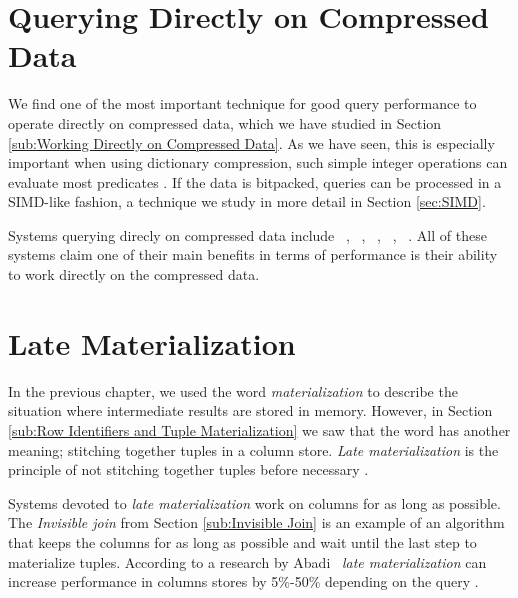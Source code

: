 \section{Querying Directly on Compressed Data}
\label{sec:Querying Directly on Compressed Data}
We find one of the most important technique for good query performance to operate directly on compressed data, which we have studied in Section \ref{sub:Working Directly on Compressed Data}. As we have seen, this is especially important when using dictionary compression, such simple integer operations can evaluate most predicates \cite{Abadi2008-dd}. If the data is bitpacked, queries can be processed in a SIMD-like fashion, a technique we study in more detail in Section \ref{sec:SIMD}.

Systems querying direcly on compressed data include \cstore~\cite{Stonebraker2005-qz}, \ibm~\cite{Raman2013-em}, \mssql~\cite{Larson2013-mc}, \blink~\cite{Johnson2008-cp}, \sapnw~\cite{Lemke2010-is}. All of these systems claim one of their main benefits in terms of performance is their ability to work directly on the compressed data.

\section{Late Materialization}
\label{sec:Late Materialization}
In the previous chapter, we used the word \textit{materialization} to describe the situation where intermediate results are stored in memory. However, in Section \ref{sub:Row Identifiers and Tuple Materialization} we saw that the word has another meaning; stitching together tuples in a column store. \textit{Late materialization} is the principle of not stitching together tuples before necessary \cite{Abadi2008-dd}.

Systems devoted to \textit{late materialization} work on columns for as long as possible. The \textit{Invisible join} from Section \ref{sub:Invisible Join} is an example of an algorithm that keeps the columns for as long as possible and wait until the last step to materialize tuples. According to a research by Abadi \ea~\textit{late materialization} can increase performance in columns stores by 5\%-50\% depending on the query \cite{Abadi2008-dd}.

